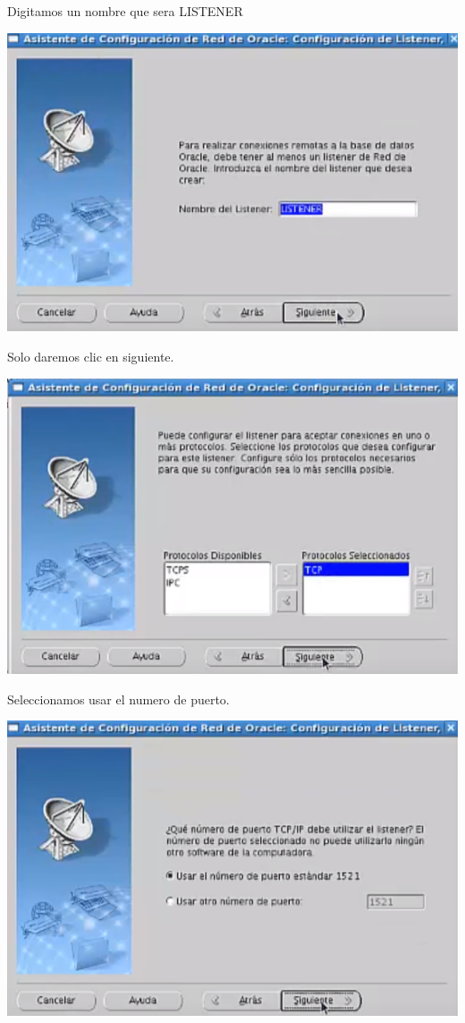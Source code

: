 \documentclass[12pt,letterpaper]{article}
\begin{document}
\newpage
Digitamos un nombre que sera LISTENER \\
\begin{center}
	\includegraphics[width=15cm]{oraclelinux/36.png}
\end{center}
Solo daremos clic en siguiente. \\
\begin{center}
	\includegraphics[width=15cm]{oraclelinux/37.png}
\end{center}
\newpage
Seleccionamos usar el numero de puerto.
\begin{center}
	\includegraphics[width=15cm]{oraclelinux/38.png}
\end{center}
\end{document}
